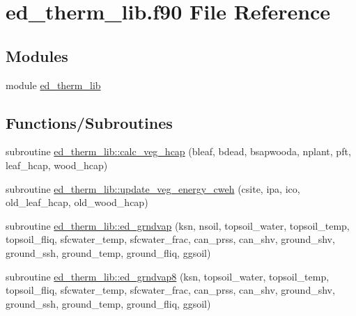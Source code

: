 \hypertarget{ed__therm__lib_8f90}{}\section{ed\+\_\+therm\+\_\+lib.\+f90 File Reference}
\label{ed__therm__lib_8f90}
\subsection*{Modules}
\begin{DoxyCompactItemize}
\item 
module \hyperlink{namespaceed__therm__lib}{ed\+\_\+therm\+\_\+lib}
\end{DoxyCompactItemize}
\subsection*{Functions/\+Subroutines}
\begin{DoxyCompactItemize}
\item 
subroutine \hyperlink{namespaceed__therm__lib_a882f2cd5f4a75f8c01d2167f45afebb7}{ed\+\_\+therm\+\_\+lib\+::calc\+\_\+veg\+\_\+hcap} (bleaf, bdead, bsapwooda, nplant, pft, leaf\+\_\+hcap, wood\+\_\+hcap)
\item 
subroutine \hyperlink{namespaceed__therm__lib_ae2a805729a52bf5814d2c3a0d84f6fe8}{ed\+\_\+therm\+\_\+lib\+::update\+\_\+veg\+\_\+energy\+\_\+cweh} (csite, ipa, ico, old\+\_\+leaf\+\_\+hcap, old\+\_\+wood\+\_\+hcap)
\item 
subroutine \hyperlink{namespaceed__therm__lib_aa6561183a4fc06ca1c9430914a5b6032}{ed\+\_\+therm\+\_\+lib\+::ed\+\_\+grndvap} (ksn, nsoil, topsoil\+\_\+water, topsoil\+\_\+temp, topsoil\+\_\+fliq, sfcwater\+\_\+temp, sfcwater\+\_\+frac, can\+\_\+prss, can\+\_\+shv, ground\+\_\+shv, ground\+\_\+ssh, ground\+\_\+temp, ground\+\_\+fliq, ggsoil)
\item 
subroutine \hyperlink{namespaceed__therm__lib_a746a2bb61d932fd3cb928a3b5e5e832e}{ed\+\_\+therm\+\_\+lib\+::ed\+\_\+grndvap8} (ksn, topsoil\+\_\+water, topsoil\+\_\+temp, topsoil\+\_\+fliq, sfcwater\+\_\+temp, sfcwater\+\_\+frac, can\+\_\+prss, can\+\_\+shv, ground\+\_\+shv, ground\+\_\+ssh, ground\+\_\+temp, ground\+\_\+fliq, ggsoil)
\end{DoxyCompactItemize}
